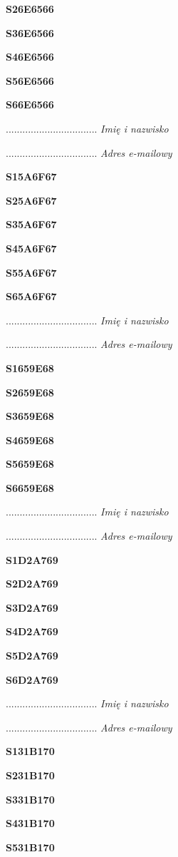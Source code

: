 \Large \textbf{S26E6566}

\Large \textbf{S36E6566}

\Large \textbf{S46E6566}

\Large \textbf{S56E6566}

\Large \textbf{S66E6566}

.................................
\textit{Imię i nazwisko}

.................................
\textit{Adres e-mailowy}

\Large \textbf{S15A6F67}

\Large \textbf{S25A6F67}

\Large \textbf{S35A6F67}

\Large \textbf{S45A6F67}

\Large \textbf{S55A6F67}

\Large \textbf{S65A6F67}

.................................
\textit{Imię i nazwisko}

.................................
\textit{Adres e-mailowy}

\Large \textbf{S1659E68}

\Large \textbf{S2659E68}

\Large \textbf{S3659E68}

\Large \textbf{S4659E68}

\Large \textbf{S5659E68}

\Large \textbf{S6659E68}

.................................
\textit{Imię i nazwisko}

.................................
\textit{Adres e-mailowy}

\Large \textbf{S1D2A769}

\Large \textbf{S2D2A769}

\Large \textbf{S3D2A769}

\Large \textbf{S4D2A769}

\Large \textbf{S5D2A769}

\Large \textbf{S6D2A769}

.................................
\textit{Imię i nazwisko}

.................................
\textit{Adres e-mailowy}

\Large \textbf{S131B170}

\Large \textbf{S231B170}

\Large \textbf{S331B170}

\Large \textbf{S431B170}

\Large \textbf{S531B170}


